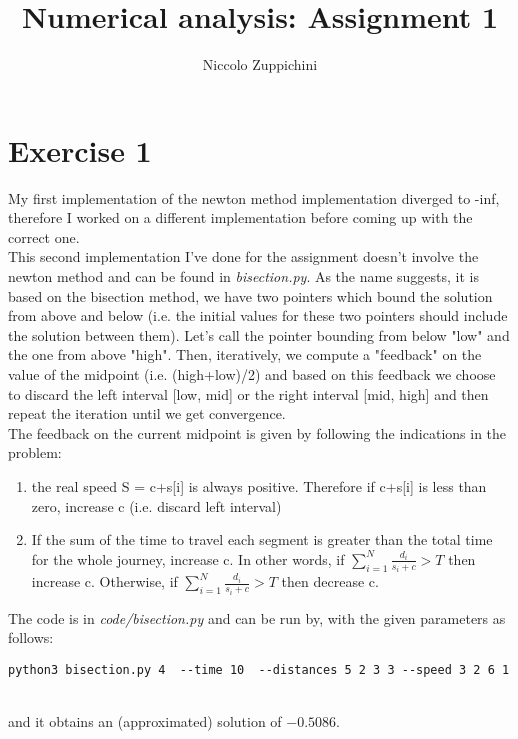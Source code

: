 \documentclass[12pt]{article}
\title{Numerical analysis: Assignment 1}
\author{Niccolo Zuppichini}
\begin{document}
\maketitle
\section*{Exercise 1}

My first implementation of the newton method implementation diverged to -inf, therefore I worked on a different implementation before coming up with the correct one. \\ 
This second implementation I've done for the assignment doesn't involve the newton method and can be found in \textit{bisection.py}.
As the name suggests, it is based on the bisection method, we have two pointers which bound the solution from above and below (i.e. the initial values for these two pointers should include the solution between them). Let's call the pointer bounding from below "low" and the one from above "high". Then, iteratively, we compute a "feedback" on the value of the midpoint (i.e. (high+low)/2) and based on this feedback we choose to discard the left interval [low, mid] or the right interval [mid, high] and then repeat the iteration until we get convergence. \\
The feedback on the current midpoint is given by following the indications in the problem: \\

\begin{enumerate}
	\item the real speed S = c+s[i] is always positive. Therefore if c+s[i] is less than zero, increase c (i.e. discard left interval)
	\item If the sum of the time to travel each segment is greater than the total time for the whole journey, increase c. In other words, if $\sum_{i=1}^N \frac{d_i}{s_i + c} > T$ then increase c. Otherwise, if $\sum_{i=1}^N \frac{d_i}{s_i + c} > T$ then decrease c.
\end{enumerate}

The code is in \textit{code/bisection.py} and can be run by, with the given parameters as follows: \\
\begin{lstlisting}
python3 bisection.py 4  --time 10  --distances 5 2 3 3 --speed 3 2 6 1	
\end{lstlisting}
\\
and it obtains an (approximated) solution of $-0.5086$. \\
\end{document}
